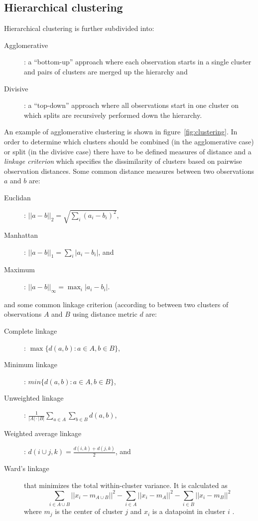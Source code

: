 \subsection{Hierarchical clustering}
\label{sec:hierarhical_clustering}

Hierarchical clustering is further subdivided into:
\begin{description}
	\item[Agglomerative]: a ``bottom-up'' approach where each observation
		starts in a single cluster and pairs of clusters are merged up the hierarchy and
	\item[Divisive]: a ``top-down'' approach where all observations start in one cluster on which
		splits are recursively performed down the hierarchy.
\end{description}
An example of agglomerative clustering is shown in figure~\ref{fig:clustering}. 
In order to determine which clusters should be combined (in the agglomerative case) or 
split (in the divisive case) there have to be defined measures of distance and a \textit{linkage 
criterion} which specifies the dissimilarity of clusters based on pairwise observation 
distances. Some common distance measures between two observations $a$ and $b$ are:
\begin{description}
	\item[Euclidan]: $||a - b||_2 = \sqrt{\sum_i (a_i - b_i)^2}$, 
	\item[Manhattan]: $||a - b||_1 = \sum_i |a_i - b_i|$, and
	\item[Maximum]: $||a - b||_{\infty} = \max_i |a_i - b_i|$.
\end{description}
and some common linkage criterion (according to \citep{szekely2005hierarchical}
between two clusters of observations $A$ and $B$ 
using distance metric $d$ are:
\begin{description}
	\item[Complete linkage]: $\max \{d(a, b): a \in A, b \in B\}$,
	\item[Minimum linkage]: $min \{d(a, b): a \in A, b \in B\}$,
	\item[Unweighted linkage]: $\frac{1}{|A| \cdot |B|} \sum_{a \in A} \sum_{b \in B} d(a, b)$,
	\item[Weighted average linkage]: $d(i \cup j, k) = \frac{d(i, k) + d(j, k)}{2}$, and
	\item[Ward's linkage] that minimizes the total within-cluster variance. It is calculated as
		$$
		\sum_{i \in A \cup B} ||x_i - m_{A \cup B}||^2 - \sum_{i \in A}||x_i - m_A||^2 
		- \sum_{i \in B} ||x_i - m_B||^2
		$$ 
		where $m_j$ is the center of cluster $j$  and $x_i$ is a datapoint
		in cluster $i$ \citep{ward1963hierarchical}.
\end{description}

